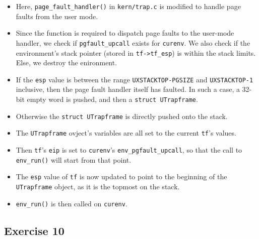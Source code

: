 \documentclass[]{article}
\begin{document}
\begin{itemize}
\itemsep1pt\parskip0pt
\item
  Here, \texttt{page\_fault\_handler()} in \texttt{kern/trap.c} is
  modified to handle page faults from the user mode.
\item
  Since the function is required to dispatch page faults to the
  user-mode handler, we check if \texttt{pgfault\_upcall} exists for
  \texttt{curenv}. We also check if the environment's stack pointer
  (stored in \texttt{tf-\textgreater{}tf\_esp}) is within the stack
  limits. Else, we destroy the enironment.
\item
  If the \texttt{esp} value is between the range
  \texttt{UXSTACKTOP-PGSIZE} and \texttt{UXSTACKTOP-1} inclusive, then
  the page fault handler itself has faulted. In such a case, a 32-bit
  empty word is pushed, and then a \texttt{struct UTrapframe}.
\item
  Otherwise the \texttt{struct UTrapframe} is directly pushed onto the
  stack.
\item
  The \texttt{UTrapframe} ovject's variables are all set to the current
  \texttt{tf}'s values.
\item
  Then \texttt{tf}'s \texttt{eip} is set to \texttt{curenv}'s
  \texttt{env\_pgfault\_upcall}, so that the call to \texttt{env\_run()}
  will start from that point.
\item
  The \texttt{esp} value of \texttt{tf} is now updated to point to the
  beginning of the \texttt{UTrapframe} object, as it is the topmost on
  the stack.
\item
  \texttt{env\_run()} is then called on \texttt{curenv}.
\end{itemize}

\subsection{Exercise 10}
\end{document}
